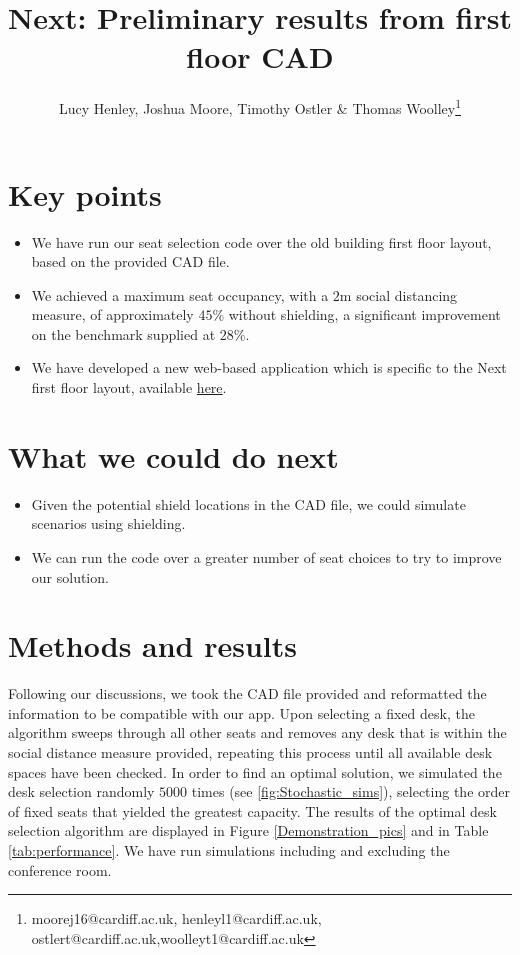 \documentclass[11pt,a4paper]{article}
\title{Next: Preliminary results from first floor CAD}
\author{Lucy Henley, Joshua Moore, Timothy Ostler \& Thomas Woolley\footnote{moorej16@cardiff.ac.uk, henleyl1@cardiff.ac.uk, ostlert@cardiff.ac.uk,woolleyt1@cardiff.ac.uk}}
\begin{document}
\maketitle

\section*{Key points}
\begin{itemize}
\item We have run our seat selection code over the old building first floor layout, based on the provided CAD file.
\item We achieved a maximum seat occupancy, with a $2$m social distancing measure, of approximately $45\%$ without shielding, a significant improvement on the benchmark supplied at $28\%$.
\item We have developed a new web-based application which is specific to the Next first floor layout, available \href{https://lucyhenley.shinyapps.io/Next_seating/?fbclid=IwAR2Rx-OmoSkYHlw6BnQSKLgJGQt7VJvaX2IJYbqgKu4MK9YZxoZn1gBBAaEp}{here}. %
\end{itemize}

\section*{What we could do next}
\begin{itemize}
\item Given the potential shield locations in the CAD file, we could simulate scenarios using shielding.
\item We can run the code over a greater number of seat choices to try to improve  our solution.
\end{itemize}



\section*{Methods and results}
Following our discussions, we took the CAD file provided and reformatted the information to be compatible with our app. Upon selecting a fixed desk, the algorithm sweeps through all other seats and removes any desk that is within the social distance measure provided, repeating this process until all available desk spaces have been checked. In order to find an optimal solution, we simulated the desk selection randomly $5000$ times (see \autoref{fig:Stochastic_sims}), selecting the order of fixed seats that yielded the greatest capacity. The results of the optimal desk selection algorithm are displayed in Figure \ref{Demonstration_pics} and in Table \ref{tab:performance}.  We have run simulations including and excluding the conference room.
\end{document}
